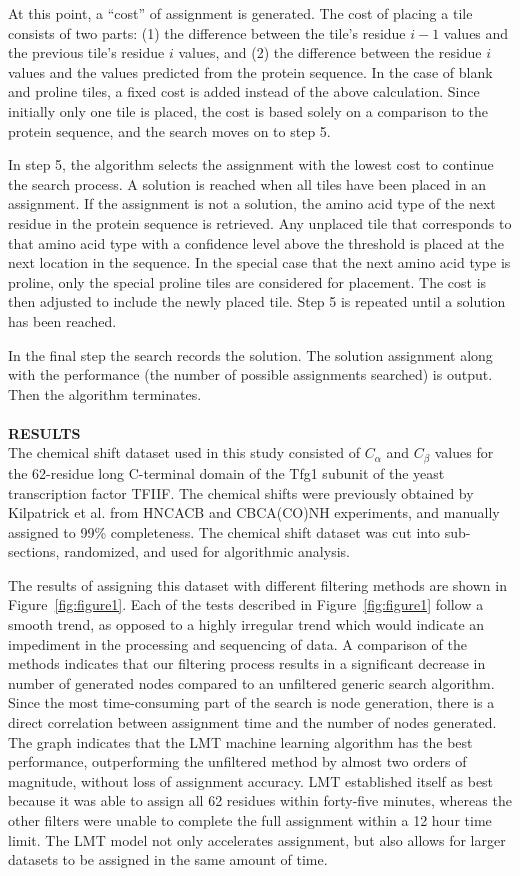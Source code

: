 \documentclass{article}
\begin{document}
At this point, a “cost” of assignment is generated. The cost of placing a tile consists of two parts: (1) the difference between the tile's residue $i-1$ values and the previous tile's residue $i$ values, and (2) the difference between the residue $i$ values and the values predicted from the protein sequence. In the case of blank and proline tiles, a fixed cost is added instead of  the above calculation. Since initially only one tile is placed, the cost is based solely on a comparison to the protein sequence, and the search moves on to step 5.

In step 5, the algorithm selects the assignment with the lowest cost to continue the search process. A solution is reached when all tiles have been placed in an assignment. If the assignment is not a solution, the amino acid type of the next residue in the protein sequence is retrieved. Any unplaced tile that corresponds to that amino acid type with a confidence level above the threshold is placed at the next location in the sequence. In the special case that the next amino acid type is proline, only the special proline tiles are considered for placement. The cost is then adjusted to include the newly placed tile. Step 5 is repeated until a solution has been reached. 

In the final step the search records the solution. The solution assignment along with the performance (the number of possible assignments searched) is output. Then the algorithm terminates. 
\\\\
\noindent\textbf{RESULTS}\\
The chemical shift dataset used in this study consisted of $C_{\alpha}$ and $C_{\beta}$ values for the 62-residue long C-terminal domain of the Tfg1 subunit of the yeast transcription factor TFIIF. The chemical shifts were previously obtained by Kilpatrick et al. from HNCACB and CBCA(CO)NH experiments, and manually assigned to 99\% completeness\cite{kilpatrick}. The chemical shift dataset was cut into sub-sections, randomized, and used for algorithmic analysis. 

The results of assigning this dataset with different filtering methods are shown in Figure~\ref{fig:figure1}. Each of the tests described in Figure~\ref{fig:figure1} follow a smooth trend, as opposed to a highly irregular trend which would indicate an impediment in the processing and sequencing of data. A comparison of the methods indicates that our filtering process results in a significant decrease in number of generated nodes compared to an unfiltered generic search algorithm. Since the most time-consuming part of the search is node generation, there is a direct correlation between assignment time and the number of nodes generated. The graph indicates that the LMT machine learning algorithm has the best performance, outperforming the unfiltered method by almost two orders of magnitude, without loss of assignment accuracy. LMT established itself as best because it was able to assign all 62 residues within forty-five minutes, whereas the other filters were unable to complete the full assignment within a 12 hour time limit. The LMT model not only accelerates assignment, but also allows for larger datasets to be assigned in the same amount of time. 
\end{document}
